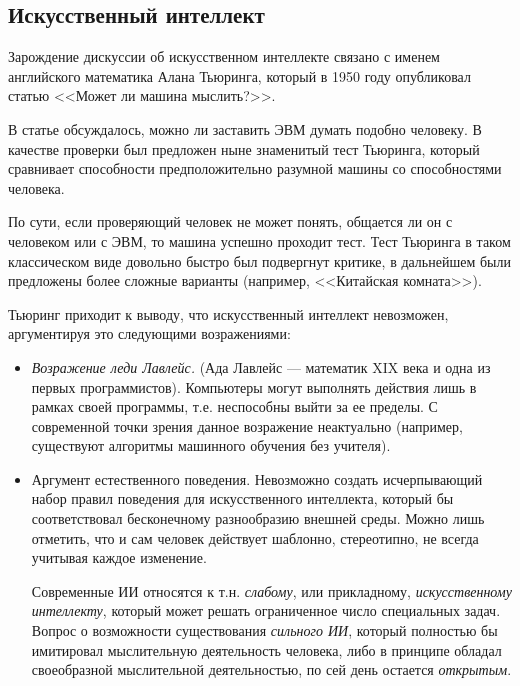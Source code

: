 \subsection{Искусственный интеллект}


Зарождение дискуссии об искусственном интеллекте связано с именем английского математика Алана Тьюринга, который в 1950 году опубликовал статью <<Может ли машина мыслить?>>.

В статье обсуждалось, можно ли заставить ЭВМ думать подобно человеку. В качестве проверки был предложен ныне знаменитый тест Тьюринга, который сравнивает способности предположительно разумной машины со способностями человека. 

По сути, если проверяющий человек не может понять, общается ли он с человеком или с ЭВМ, то машина успешно проходит тест. Тест Тьюринга в таком классическом виде довольно быстро был подвергнут критике, в дальнейшем были предложены более сложные варианты (например, <<Китайская комната>>). 

Тьюринг приходит к выводу, что искусственный интеллект невозможен, аргументируя это следующими возражениями: 
\begin{itemize} 
    \item \textit{Возражение леди Лавлейс.} (Ада Лавлейс --- математик XIX века и одна из первых программистов). Компьютеры могут выполнять действия лишь в рамках своей программы, т.е. неспособны выйти за ее пределы. С современной точки зрения данное возражение неактуально (например, существуют алгоритмы машинного обучения без учителя).
    \item Аргумент естественного поведения. Невозможно создать исчерпывающий набор правил поведения для искусственного интеллекта, который бы соответствовал бесконечному разнообразию внешней среды. Можно лишь отметить, что и сам человек действует шаблонно, стереотипно, не всегда учитывая каждое изменение.

Современные ИИ относятся к т.н. \textit{слабому}, или прикладному, \textit{искусственному интеллекту}, который может решать ограниченное число специальных задач. Вопрос о возможности существования \textit{сильного ИИ}, который полностью бы имитировал мыслительную деятельность человека, либо в принципе обладал своеобразной мыслительной деятельностью, по сей день остается \textit{открытым}.
\end{itemize}

